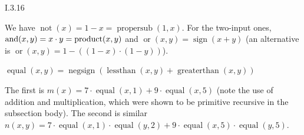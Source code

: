 %
\begin{ans}{I.3.16}
\begin{exparts}
\item
We have $\operatorname{not}(x)=1-x=\operatorname{propersub}(1,x)$.
For the two-input ones,
$\operatorname{and}(x,y)=x\cdot y=\operatorname{product}(x,y)$
and
$\operatorname{or}(x,y)=\operatorname{sign}(x+y)$
(an alternative is $\operatorname{or}(x,y)=1-((1-x)\cdot (1-y))$).

\item
$\operatorname{equal}(x,y)=\operatorname{negsign}(\operatorname{lessthan}(x,y)+\operatorname{greaterthan}(x,y))$

\item
The first is
$m(x)=7\cdot\operatorname{equal}(x,1)
      +9\cdot\operatorname{equal}(x,5)$
(note the use of addition and multiplication, which were shown to be
primitive recursive in the subsection body).
The second is similar
$n(x,y)=7\cdot\operatorname{equal}(x,1)\cdot\operatorname{equal}(y,2)
        +9\cdot\operatorname{equal}(x,5)\cdot\operatorname{equal}(y,5)$.
\end{exparts}
\end{ans}
%
